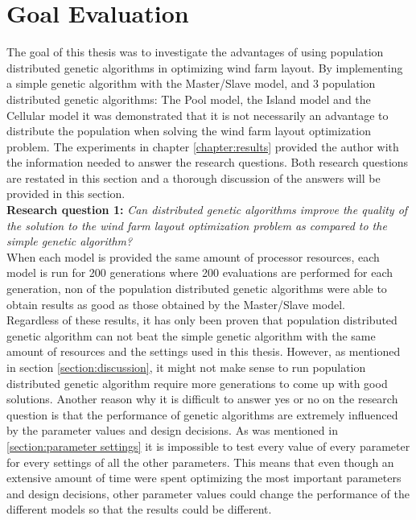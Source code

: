 \section{Goal Evaluation}


\noindent The goal of this thesis was to investigate the advantages of using population distributed genetic algorithms in optimizing wind farm layout. By implementing a simple genetic algorithm with the Master/Slave model, and 3 population distributed genetic algorithms: The Pool model, the Island model and the Cellular model it was demonstrated that it is not necessarily an advantage to distribute the population when solving the wind farm layout optimization problem. The experiments in chapter \ref{chapter:results} provided the author with the information needed to answer the research questions. Both research questions are restated in this section and a thorough discussion of the answers will be provided in this section.\\


\noindent \textbf{Research question 1: } \textit{Can distributed genetic algorithms improve the quality of the solution to the wind farm layout optimization problem as compared to the simple genetic algorithm?}\\


\noindent When each model is provided the same amount of processor resources, each model is run for 200 generations where 200 evaluations are performed for each generation, non of the population distributed genetic algorithms were able to obtain results as good as those obtained by the Master/Slave model.\\


\noindent Regardless of these results, it has only been proven that population distributed genetic algorithm can not beat the simple genetic algorithm with the same amount of resources and the settings used in this thesis. However, as mentioned in section \ref{section:discussion}, it might not make sense to run population distributed genetic algorithm require more generations to come up with good solutions. Another reason why it is difficult to answer yes or no on the research question is that the performance of genetic algorithms are extremely influenced by the parameter values and design decisions. As was mentioned in \ref{section:parameter settings} it is impossible to test every value of every parameter for every settings of all the other parameters. This means that even though an extensive amount of time were spent optimizing the most important parameters and design decisions, other parameter values could change the performance of the different models so that the results could be different. \\


